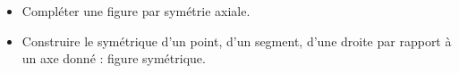 \begin{prerequis}    
    \begin{itemize}
        \item[\emoji{diamond-suit}] Compléter une figure par symétrie axiale.
        \item[\emoji{diamond-suit}] Construire le symétrique d’un point, d’un segment, d’une droite par rapport à un axe donné : figure symétrique.
    \end{itemize}
\end{prerequis}